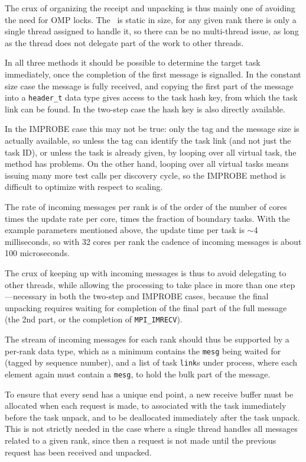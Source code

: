 \documentclass[paper=a4,fontsize=11pt]{scrartcl}
\numberwithin{equation}{section}		%
\numberwithin{figure}{section}			%
\numberwithin{table}{section}				%
\newcommand{\codecolor}{\color{Blue}}
\newcommand{\Code}[1]{{\codecolor\texttt{#1}}}
\begin{document}
The crux of organizing the receipt and unpacking is thus mainly one of avoiding the need for OMP locks.  The \mesgrecvlist\ is static in size, for any given rank there is only a single thread assigned to handle it, so there can be no multi-thread issue, as long as the thread does not delegate part of the work to other threads.

In all three methods it should be possible to determine the target task immediately, once the completion of the first message is signalled.  In the constant size case the message is fully received, and copying the first part of the message into a \Code{header\_t} data type gives access to the task hash key, from which the task link can be found.   In the two-step case the hash key is also directly available. 

In the IMPROBE case this may not be true: only the tag and the message size is actually available, so unless the tag can identify the task link (and not just the task ID), or unless the task is already given, by looping over all virtual task, the method has problems.  On the other hand, looping over all virtual tasks means issuing many more test calls per discovery cycle, so the IMPROBE method is difficult to optimize with respect to scaling.

The rate of incoming messages per rank is of the order of the number of cores times the update rate per core, times the fraction of boundary tasks.  With the example parameters mentioned above, the update time per task is $\sim$4 milliseconds, so with 32 cores per rank the cadence of incoming messages is about 100 microseconds.

The crux of keeping up with incoming messages is thus to avoid delegating to other threads, while allowing the processing to take place in more than one step---necessary in both the two-step and IMPROBE cases, because the final unpacking requires waiting for completion of the final part of the full message (the 2nd part, or the completion of \Code{MPI\_IMRECV}).

The stream of incoming messages for each rank should thus be supported by a per-rank data type, which as a minimum contains the \Code{mesg} being waited for (tagged by sequence number), and a list of task \Code{link}s under process, where each element again must contain a \Code{mesg}, to hold the bulk part of the message.

To ensure that every send has a unique end point, a new receive buffer must be allocated when each request is made, to associated with the task immediately before the task unpack, and to be deallocated immediately after the task unpack.
This is not strictly needed in the case where a single thread handles all messages related to a given rank, since then a request is not made until the previous request has been received and unpacked.
\end{document}

